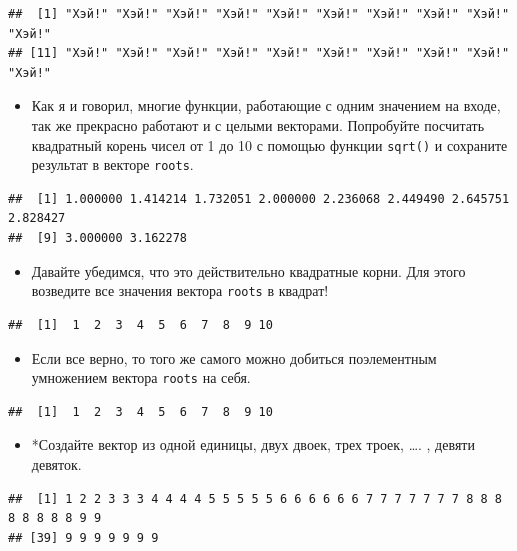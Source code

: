 \documentclass[]{book}
\providecommand{\tightlist}{%
  \setlength{\itemsep}{0pt}\setlength{\parskip}{0pt}}
\begin{document}
\begin{verbatim}
##  [1] "Хэй!" "Хэй!" "Хэй!" "Хэй!" "Хэй!" "Хэй!" "Хэй!" "Хэй!" "Хэй!" "Хэй!"
## [11] "Хэй!" "Хэй!" "Хэй!" "Хэй!" "Хэй!" "Хэй!" "Хэй!" "Хэй!" "Хэй!" "Хэй!"
\end{verbatim}

\begin{itemize}
\tightlist
\item
  Как я и говорил, многие функции, работающие с одним значением на
  входе, так же прекрасно работают и с целыми векторами. Попробуйте
  посчитать квадратный корень чисел от 1 до 10 с помощью функции
  \texttt{sqrt()} и сохраните результат в векторе \texttt{roots}.
\end{itemize}

\begin{verbatim}
##  [1] 1.000000 1.414214 1.732051 2.000000 2.236068 2.449490 2.645751 2.828427
##  [9] 3.000000 3.162278
\end{verbatim}

\begin{itemize}
\tightlist
\item
  Давайте убедимся, что это действительно квадратные корни. Для этого
  возведите все значения вектора \texttt{roots} в квадрат!
\end{itemize}

\begin{verbatim}
##  [1]  1  2  3  4  5  6  7  8  9 10
\end{verbatim}

\begin{itemize}
\tightlist
\item
  Если все верно, то того же самого можно добиться поэлементным
  умножением вектора \texttt{roots} на себя.
\end{itemize}

\begin{verbatim}
##  [1]  1  2  3  4  5  6  7  8  9 10
\end{verbatim}

\begin{itemize}
\tightlist
\item
  *Создайте вектор из одной единицы, двух двоек, трех троек, \ldots{}. ,
  девяти девяток.
\end{itemize}

\begin{verbatim}
##  [1] 1 2 2 3 3 3 4 4 4 4 5 5 5 5 5 6 6 6 6 6 6 7 7 7 7 7 7 7 8 8 8 8 8 8 8 8 9 9
## [39] 9 9 9 9 9 9 9
\end{verbatim}
\end{document}
